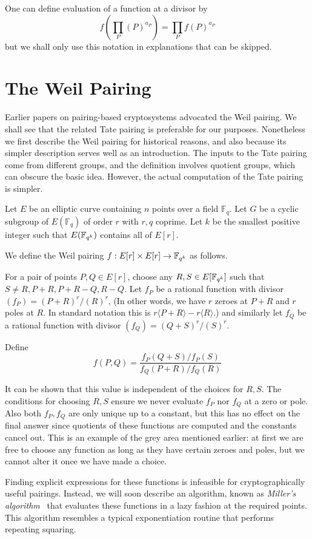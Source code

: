One can define evaluation of a function at a divisor by
\[ f( \prod_P (P)^{a_P} ) = \prod_P f(P)^{a_P} \]
but we shall only use this notation in explanations that can be skipped.

\section {The Weil Pairing}

Earlier papers on pairing-based cryptosystems advocated the Weil pairing.
We shall see that the related Tate pairing is preferable for our purposes.
Nonetheless we first describe the Weil pairing
for historical reasons, and also because its simpler description
serves well as an introduction. The inputs to the Tate pairing come
from different groups, and the definition involves quotient groups,
which can obscure the basic idea. However, the actual computation
of the Tate pairing is simpler.

Let $E$ be an elliptic curve containing $n$ points over a field $\mathbb{F}_q$.
Let $G$ be a cyclic subgroup of $E(\mathbb{F}_q)$ of order $r$ with $r, q$
coprime. Let $k$ be the smallest positive integer such that $E(\mathbb{F}_{q^k})$
contains all of $E[r]$.

We define the Weil pairing
$f:E[r] \times E[r] \rightarrow \mathbb{F}_{q^k}$ as follows.

For a pair of points $P, Q \in E[r]$,
choose any $R, S \in E[\mathbb{F}_{q^k}]$ such that $S \ne R, P+R, P+R - Q, R-Q$.
Let $f_P$ be a rational function with divisor $(f_P) = (P+R)^r /(R)^r$,
(In other words, we have $r$ zeroes at $P+R$ and $r$ poles at $R$.
In standard notation this is $r\langle P+R\rangle  - r\langle R\rangle$.)
and similarly let $f_Q$ be a rational function with divisor
$(f_Q) = (Q+S)^r/(S)^r$.

Define
\[ f(P,Q) = \frac{f_P(Q+S)/f_P(S)}{f_Q(P+R)/f_Q(R)} \]

It can be shown that this value is independent
of the choices for $R, S$. The conditions for choosing $R, S$ ensure
we never evaluate $f_P$ nor $f_Q$ at a zero or pole.
Also both $f_P, f_Q$ are only unique up to a constant,
but this has no effect on the final answer since quotients
of these functions are computed and the constants cancel out.
This is an example of the grey area mentioned earlier:
at first we are free to choose
any function as long as they have certain zeroes and poles, but we cannot
alter it once we have made a choice.

Finding explicit expressions for these functions is infeasible for
cryptographically useful pairings. Instead, we will soon describe
an algorithm, known as \emph{Miller's algorithm}~\cite{miller}
that evaluates these functions in a lazy fashion at the required
points. This algorithm resembles a typical exponentiation routine
that performs repeating squaring.

